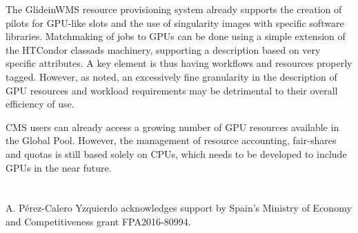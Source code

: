 \documentclass{webofc}
\begin{document}
The GlideinWMS resource provisioning system already supports the creation of pilots for GPU-like slots and the use of singularity images with specific software libraries. Matchmaking of jobs to GPUs can be done using a simple extension of the HTCondor classads machinery, supporting a description based on very specific attributes. A key element is thus having workflows and resources properly tagged. However, as noted, an excessively fine granularity in the description of GPU resources and workload requirements may be detrimental to their overall efficiency of use.

CMS users can already access a growing number of GPU resources available in the Global Pool. However, the management of resource accounting, fair-shares and quotas is still based solely on CPUs, which needs to be developed to include GPUs in the near future. 

\section*{}
\label{acknowledgements}
\begin{acknowledgement}
A. P\'erez-Calero Yzquierdo acknowledges support by Spain’s Ministry of Economy and Competitiveness grant FPA2016-80994.
\end{acknowledgement}

\end{document}
